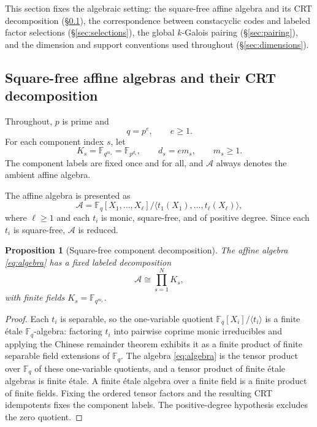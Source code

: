 \documentclass[10pt,a4paper]{article}
\newcommand{\F}{\mathbb F}
\newcommand{\A}{\mathcal A}
\numberwithin{equation}{section}
\theoremstyle{plain}
\newtheorem{proposition}[theorem]{Proposition}
\theoremstyle{definition}
\theoremstyle{remark}
\begin{document}
This section fixes the algebraic setting: the square-free affine algebra and its
CRT decomposition (\S\ref{sec:setup}), the correspondence between constacyclic
codes and labeled factor selections (\S\ref{sec:selections}), the global
$k$-Galois pairing (\S\ref{sec:pairing}), and the dimension and support
conventions used throughout (\S\ref{sec:dimensions}).

\subsection{Square-free affine algebras and their CRT decomposition}\label{sec:setup}

Throughout, $p$ is prime and
\[
q=p^e,\qquad e\geq 1 .
\]
For each component index $s$, let
\[
K_s=\F_{q^{m_s}}=\F_{p^{d_s}},\qquad d_s=e m_s,\qquad m_s\geq 1 .
\]
The component labels are fixed once and for all, and $\A$ always denotes the
ambient affine algebra.

The affine algebra is presented as
\begin{equation}\label{eq:algebra}
\A=\F_q[X_1,\ldots,X_\ell]
 \big/\langle t_1(X_1),\ldots,t_\ell(X_\ell)\rangle,
\end{equation}
where $\ell\geq 1$ and each $t_i$ is monic, square-free, and of positive degree.
Since each $t_i$ is square-free, $\A$ is reduced.

\begin{proposition}[Square-free component decomposition]\label{prop:decomposition}
The affine algebra \eqref{eq:algebra} has a fixed labeled decomposition
\begin{equation}\label{eq:decomp}
\A\cong\prod_{s=1}^{N}K_s,
\end{equation}
with finite fields $K_s=\F_{q^{m_s}}$.
\end{proposition}

\begin{proof}
Each $t_i$ is separable, so the one-variable quotient $\F_q[X_i]/\langle t_i\rangle$
is a finite \'etale $\F_q$-algebra: factoring $t_i$ into pairwise coprime monic
irreducibles and applying the Chinese remainder theorem exhibits it as a finite
product of finite separable field extensions of $\F_q$. The algebra
\eqref{eq:algebra} is the tensor product over $\F_q$ of these one-variable
quotients, and a tensor product of finite \'etale algebras is finite \'etale. A
finite \'etale algebra over a finite field is a finite product of finite fields.
Fixing the ordered tensor factors and the resulting CRT idempotents fixes the
component labels. The positive-degree hypothesis excludes the zero quotient.
\end{proof}
\end{document}
